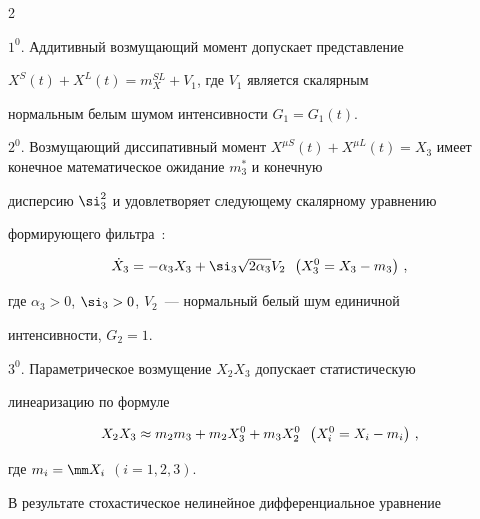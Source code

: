 \begin{multicols}{2}
\smallskip





$1^0$. Аддитивный возмущающий момент допускает представление


$X^S (t) + X^L (t) = m_X^{SL}+V_1$, где $V_1 $ является скалярным


нормальным белым шумом интенсивности $G_1 = G_1(t)$.





\smallskip





$2^0$. Возмущающий диссипативный момент  $X^{\mu S} (t) + X^{\mu L}


(t) = X_3$ имеет конечное математическое ожидание $m_3^*$ и конечную


дисперсию $\si_3^2$ и удовлетворяет следующему скалярному уравнению


формирующего фильтра~\cite{11-mar}:


\begin{equation}


\dot X_3 =-\alpha_3 X_3 + \si_3 \sqrt{2\alpha_3} V_2\enskip \left(X_3^0 = X_3 -m_3\right)\,,


\label{e13-mar}


\end{equation}


где $\alpha_3 >0$, $\si_3 >0$, $V_2$~--- нормальный белый шум единичной


интенсивности, $G_2 =1$.





\smallskip





$3^0$. Параметрическое возмущение  $X_2 X_3$ допускает статистическую


линеаризацию по формуле~\cite{11-mar}


\begin{equation*}


X_2 X_3 \approx m_2 m_3 + m_2 X_3^0 + m_3 X_2^0 \enskip \left( X_i^0 = X_i- m_i\right)\,,




\end{equation*}


где $m_i = \mm X_i$ $( i=1,2,3)$.





В результате стохастическое нелинейное дифференциальное уравнение



\end{multicols}
